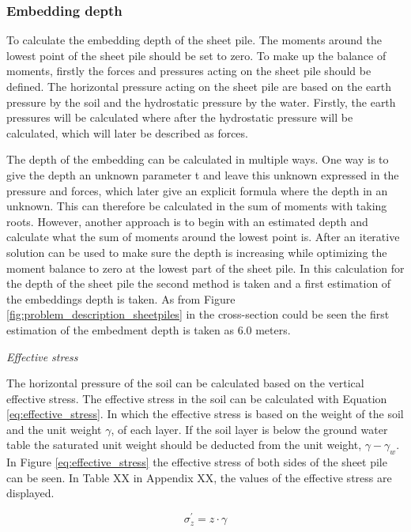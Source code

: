 \subsubsection{Embedding depth}

To calculate the embedding depth of the sheet pile. The moments around the lowest point of the sheet pile should be set to zero. To make up the balance of moments, firstly the forces and pressures acting on the sheet pile should be defined. The horizontal pressure acting on the sheet pile are based on the earth pressure by the soil and the hydrostatic pressure by the water. Firstly, the earth pressures will be calculated where after the hydrostatic pressure will be calculated, which will later be described as forces.

The depth of the embedding can be calculated in multiple ways. One way is to give the depth an unknown parameter t and leave this unknown expressed in the pressure and forces, which later give an explicit formula where the depth in an unknown. This can therefore be calculated in the sum of moments with taking roots. However, another approach is to begin with an estimated depth and calculate what the sum of moments around the lowest point is. After an iterative solution can be used to make sure the depth is increasing while optimizing the moment balance to zero at the lowest part of the sheet pile. In this calculation for the depth of the sheet pile the second method is taken and a first estimation of the embeddings depth is taken. As from Figure \ref{fig:problem_description_sheetpiles} in the cross-section could be seen the first estimation of the embedment depth is taken as 6.0 meters.

\textit{Effective stress}

The horizontal pressure of the soil can be calculated based on the vertical effective stress. The effective stress in the soil can be calculated with Equation \ref{eq:effective_stress}. In which the effective stress is based on the weight of the soil and the unit weight $\gamma$, of each layer. If the soil layer is below the ground water table the saturated unit weight should be deducted from the unit weight, $\gamma - \gamma_{w}$. In Figure \ref{eq:effective_stress} the effective stress of both sides of the sheet pile can be seen. In Table XX in Appendix XX, the values of the effective stress are displayed.

\begin{equation}
    \sigma^{'}_{z} = z \cdot \gamma
    \label{eq:effective_stress}
\end{equation}

